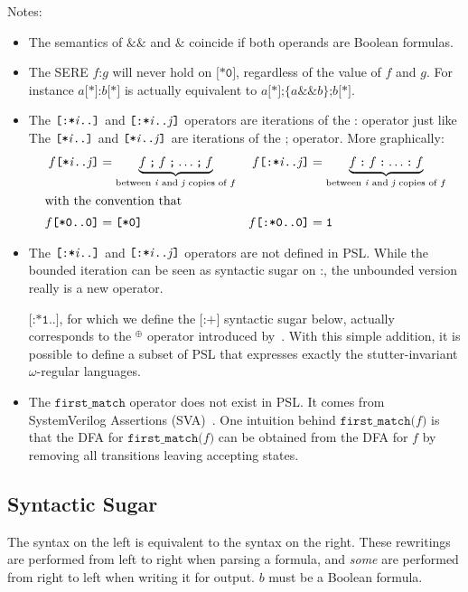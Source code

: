 \documentclass[a4paper,twoside,10pt,DIV=12]{scrreprt}
\newcommand{\AND}{\mathbin{\texttt{\&}}}
\newcommand{\ANDALT}{\mathbin{\texttt{\&\&}}}
\newcommand{\FUSION}{\mathbin{\texttt{:}}}
\newcommand{\CONCAT}{\mathbin{\texttt{;}}}
\newcommand{\0}{\texttt{0}}
\newcommand{\1}{\texttt{1}}
\newcommand{\STAR}[1]{\texttt{[*#1]}}
\newcommand{\FSTAR}[1]{\texttt{[:*#1]}}
\newcommand{\FPLUS}{\texttt{[:+]}}
\newcommand{\FIRSTMATCH}{\texttt{first\_match}}
\newcommand{\eword}{\texttt{[*0]}}
\newcommand{\sere}[1]{\texttt{\{}#1\texttt{\}}}
\newcommand\mvar[1]{\ensuremath{\mathit{#1}}}
\newcommand\code[1]{\texttt{#1}}
\begin{document}
Notes:
\begin{itemize}
\item The semantics of $\ANDALT$ and $\AND$ coincide if both
operands are Boolean formulas.
\item The SERE $f\FUSION g$ will never hold on $\eword$,
  regardless of the value of $f$ and $g$.  For instance
  $a\STAR{}\FUSION b\STAR{}$ is actually equivalent to
  $a\STAR{}\CONCAT\sere{a\ANDALT b}\CONCAT b\STAR{}$.
\item The $\FSTAR{\mvar{i}..}$ and $\FSTAR{\mvar{i}..\mvar{j}}$ operators are
  iterations of the $\FUSION$ operator just like
  The $\STAR{\mvar{i}..}$ and $\STAR{\mvar{i}..\mvar{j}}$ are
  iterations of the $\CONCAT$ operator.  More graphically:
  \begin{align*}
    f\STAR{\mvar{i}..\mvar{j}} &=
    \underbrace{f\CONCAT f\CONCAT \ldots \CONCAT f}_{\text{between $\mvar{i}$ and $\mvar{j}$ copies of $f$}} &
    f\FSTAR{\mvar{i}..\mvar{j}} &=
    \underbrace{f\FUSION f\FUSION \ldots \FUSION f}_{\text{between $\mvar{i}$ and $\mvar{j}$ copies of $f$}}\\
    \intertext{with the convention that}
    f\STAR{0..0} &= \eword &
    f\FSTAR{0..0} &= \1
  \end{align*}
\item The $\FSTAR{\mvar{i}..}$ and $\FSTAR{\mvar{i}..\mvar{j}}$
  operators are not defined in PSL.  While the bounded iteration can
  be seen as syntactic sugar on $\FUSION$, the unbounded version
  really is a new operator.

  $\FSTAR{1..}$, for which we define the $\FPLUS$ syntactic sugar
  below, actually corresponds to the $^\oplus$ operator introduced
  by~\citet{dax.09.atva}.  With this simple addition, it is possible
  to define a subset of PSL that expresses exactly the
  stutter-invariant $\omega$-regular languages.
\item The $\FIRSTMATCH$ operator does not exist in PSL.  It comes
  from SystemVerilog Assertions (SVA)~\cite{systemverilog.18.std}.
  One intuition behind $\FIRSTMATCH\code(f\code)$ is that the
  DFA for $\FIRSTMATCH\code(f\code)$ can be obtained from the DFA
  for $f$ by removing all transitions leaving accepting states.
\end{itemize}

\subsection{Syntactic Sugar}

The syntax on the left is equivalent to the syntax on the right.
These rewritings are performed from left to right when parsing a
formula, and \emph{some} are performed from right to left when writing
it for output.  $b$ must be a Boolean formula.
\end{document}
